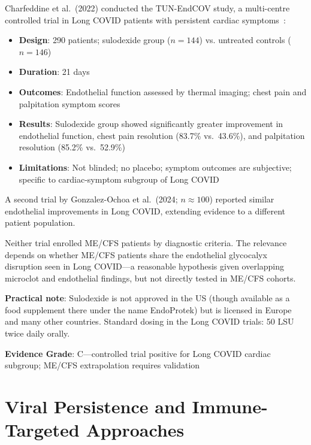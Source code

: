 Charfeddine et al.\ (2022) conducted the TUN-EndCOV study, a multi-centre controlled trial in Long COVID patients with persistent cardiac symptoms~\cite{Charfeddine2022sulodexide}:
\begin{itemize}
    \item \textbf{Design}: 290 patients; sulodexide group ($n=144$) vs. untreated controls ($n=146$)
    \item \textbf{Duration}: 21 days
    \item \textbf{Outcomes}: Endothelial function assessed by thermal imaging; chest pain and palpitation symptom scores
    \item \textbf{Results}: Sulodexide group showed significantly greater improvement in endothelial function, chest pain resolution (83.7\% vs.\ 43.6\%), and palpitation resolution (85.2\% vs.\ 52.9\%)
    \item \textbf{Limitations}: Not blinded; no placebo; symptom outcomes are subjective; specific to cardiac-symptom subgroup of Long COVID
\end{itemize}

A second trial by Gonzalez-Ochoa et al.\ (2024; $n \approx 100$) reported similar endothelial improvements in Long COVID, extending evidence to a different patient population.

\begin{limitation}
Neither trial enrolled ME/CFS patients by diagnostic criteria. The relevance depends on whether ME/CFS patients share the endothelial glycocalyx disruption seen in Long COVID---a reasonable hypothesis given overlapping microclot and endothelial findings, but not directly tested in ME/CFS cohorts.
\end{limitation}

\textbf{Practical note}: Sulodexide is not approved in the US (though available as a food supplement there under the name EndoProtek) but is licensed in Europe and many other countries. Standard dosing in the Long COVID trials: 50 LSU twice daily orally.

\textbf{Evidence Grade}: C---controlled trial positive for Long COVID cardiac subgroup; ME/CFS extrapolation requires validation

\section{Viral Persistence and Immune-Targeted Approaches}
\label{sec:viral-persistence-immune}

